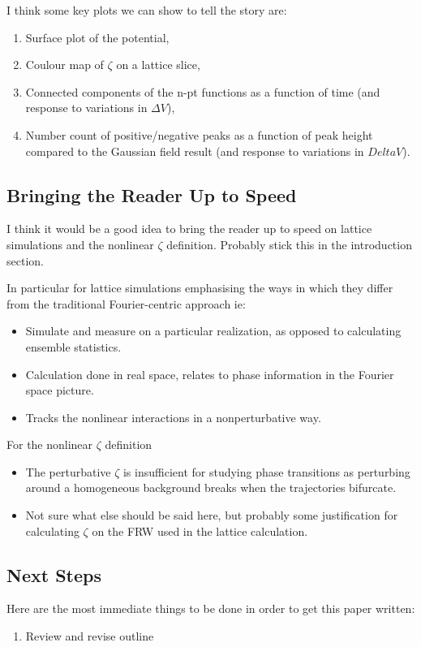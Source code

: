 \documentclass[11pt]{article}
\begin{document}
I think some key plots we can show to tell the story are:
\begin{enumerate}
  \item Surface plot of the potential,
  \item Coulour map of $\zeta$ on a lattice slice, 
  \item Connected components of the n-pt functions as a function of time (and response to variations in $\Delta V$),
  \item Number count of positive/negative peaks as a function of peak height compared to the Gaussian field result (and response to variations in $Delta V$).
\end{enumerate}

\subsection{Bringing the Reader Up to Speed}
I think it would be a good idea to bring the reader up to speed on lattice simulations and the nonlinear $\zeta$ definition. Probably stick this in the introduction section.

In particular for lattice simulations emphasising the ways in which they differ from the traditional Fourier-centric approach ie:
\begin{itemize}
  \item Simulate and measure on a particular realization, as opposed to calculating ensemble statistics.
  \item Calculation done in real space, relates to phase information in the Fourier space picture.
  \item Tracks the nonlinear interactions in a nonperturbative way.
\end{itemize}

For the nonlinear $\zeta$ definition
\begin{itemize}
  \item The perturbative $\zeta$ is insufficient for studying phase transitions as perturbing around a homogeneous background breaks when the trajectories bifurcate.
  \item Not sure what else should be said here, but probably some justification for calculating $\zeta$ on the FRW used in the lattice calculation.
\end{itemize}

\subsection{Next Steps}
Here are the most immediate things to be done in order to get this paper written:
\begin{enumerate}
  \item Review and revise outline
\end{enumerate}
\end{document}
